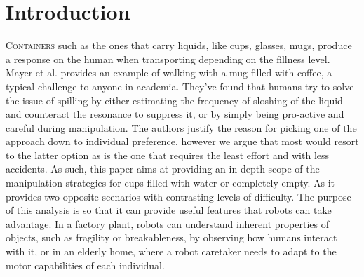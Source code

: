 \section{Introduction}

\lettrine{C}{ontainers} such as the ones that carry liquids, like cups, glasses, mugs, produce a response on the human when transporting depending on the fillness level. Mayer et al. \cite{mayer_walking_2012} provides an example of walking with a mug filled with coffee, a typical challenge to anyone in academia. They've found that humans try to solve the issue of spilling by either estimating the frequency of sloshing of the liquid and counteract the resonance to suppress it, or by simply being pro-active and careful during manipulation. The authors justify the reason for picking one of the approach down to individual preference, however we argue that most would resort to the latter option as is the one that requires the least effort and with less accidents. As such, this paper aims at providing an in depth scope of the manipulation strategies for cups filled with water or completely empty. As it provides two opposite scenarios with contrasting levels of difficulty. The purpose of this analysis is so that it can provide useful features that robots can take advantage. In a factory plant, robots can understand inherent properties of objects, such as fragility or breakableness, by observing how humans interact with it, or in an elderly home, where a robot caretaker needs to adapt to the motor capabilities of each individual. 



